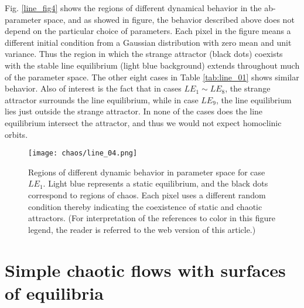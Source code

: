 Fig. \ref{line_fig4} shows the regions of different
dynamical behavior in the ab-parameter space, and as showed in figure, the behavior described above does not
depend on the particular choice of parameters.
Each pixel in the figure means a different initial condition from a Gaussian distribution
with zero mean and unit variance.
Thus the region in which the strange attractor (black dots) coexists with the
stable line equilibrium (light blue background) extends
throughout much of the parameter space. The other eight
cases in Table \ref{tab:line_01} shows similar behavior.
Also of interest is the fact that in cases $LE_1\sim{}LE_8$, the
strange attractor surrounds the line equilibrium, while in
case $LE_9$, the line equilibrium lies just outside the strange
attractor. In none of the cases does the line equilibrium
intersect the attractor, and thus we would not expect
homoclinic orbits.

\begin{figure}[htbp]
\centering
\texttt{[image: chaos/line\_04.png]}
\caption{\label{fig:line_fig4}
Regions of different dynamic behavior in parameter space for case $LE_1$. Light blue represents a static equilibrium, and the black dots correspond to
regions of chaos. Each pixel uses a different random condition thereby indicating the coexistence of static and chaotic attractors. (For interpretation of the
references to color in this figure legend, the reader is referred to the web version of this article.)}
\end{figure}


\section{Simple chaotic flows with surfaces of equilibria}

